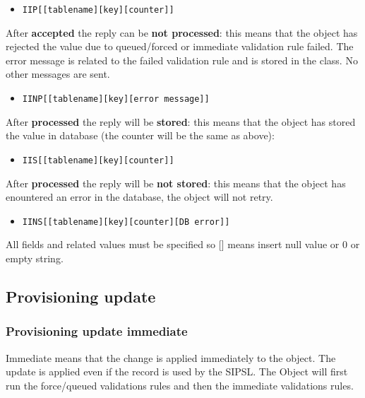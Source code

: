\documentclass[a4paper]{article}
\begin{document}
\begin{itemize}
	\item {\tt IIP[[tablename][key][counter]]}
\end{itemize}

After {\bf accepted} the reply can be {\bf not processed}: this means that the
object has rejected the value due to queued/forced or immediate validation rule
failed. The error message is related to the failed validation rule and is
stored in the class. No other messages are sent. 

\begin{itemize}
	\item {\tt IINP[[tablename][key][error message]]}
\end{itemize}

After {\bf processed} the reply will be {\bf stored}: this means that the
object has stored the value in database (the counter will be the same as above):

\begin{itemize}
	\item {\tt IIS[[tablename][key][counter]]}
\end{itemize}

After {\bf processed} the reply will be {\bf not stored}: this means that the
object has enountered an error in the database, the object will not retry.

\begin{itemize}
	\item {\tt IINS[[tablename][key][counter][DB error]]}
\end{itemize}

All fields and related values must be specified so [] means insert null value or
0 or empty string.







\subsection{Provisioning update}

\subsubsection{Provisioning update immediate}

Immediate means that the change is applied immediately to the object. The
update is applied even if the record is used by the SIPSL.
The Object will first run the force/queued validations rules and then the
immediate validations rules.
\end{document}
